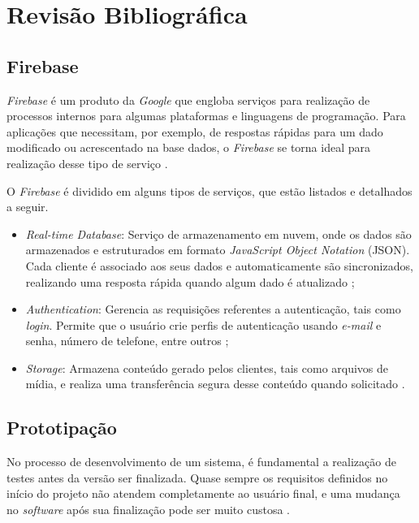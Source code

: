 \chapter{Revisão Bibliográfica}

\section{Firebase}

\textit{Firebase} é um produto da \textit{Google} que engloba serviços para realização de  processos internos para algumas plataformas e linguagens de programação. Para aplicações que necessitam, por exemplo, de respostas rápidas para um dado modificado ou acrescentado na base dados, o \textit{Firebase} se torna ideal para realização desse tipo de serviço \cite{firebase}.

O \textit{Firebase} é dividido em alguns tipos de serviços, que estão listados e detalhados a seguir.

\begin{itemize}
    \item \textit{Real-time Database}: Serviço de armazenamento em nuvem, onde os dados são armazenados e estruturados em formato \textit{JavaScript Object Notation} (JSON). Cada cliente é associado aos seus dados e automaticamente são sincronizados, realizando uma resposta rápida quando algum dado é atualizado \cite{firebase};
    \item \textit{Authentication}: Gerencia as requisições referentes a autenticação, tais como \textit{login}. Permite que o usuário crie perfis de autenticação usando \textit{e-mail} e senha, número de telefone, entre outros \cite{firebase};
    \item \textit{Storage}: Armazena conteúdo gerado pelos clientes, tais como arquivos de mídia, e realiza uma transferência segura desse conteúdo quando solicitado \cite{firebase}. 
\end{itemize}

\section{Prototipação}

No processo de desenvolvimento de um sistema, é fundamental a realização de testes antes da versão ser finalizada. Quase sempre os requisitos definidos no início do projeto não atendem completamente ao usuário final, e uma mudança no \textit{software} após sua finalização pode ser muito custosa \cite{prototipacao}.

